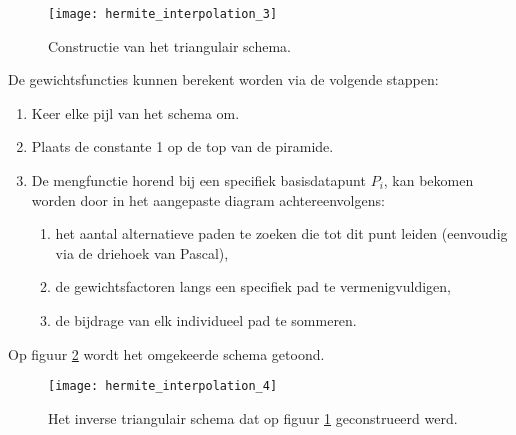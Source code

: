 \begin{itemize}
{\begin{itemize}
				\begin{figure}[ht]
					\centering
					\texttt{[image: hermite\_interpolation\_3]}
					\caption{Constructie van het triangulair schema.}
					\label{fig:20triangular}
				\end{figure}
				De gewichtsfuncties kunnen berekent worden via de volgende stappen:
				\begin{enumerate}
					\item Keer elke pijl van het schema om.
					\item Plaats de constante 1 op de top van de piramide.
					\item De mengfunctie horend bij een specifiek basisdatapunt $P_i$, kan bekomen worden door in het aangepaste diagram achtereenvolgens:
						\begin{enumerate}
							\item het aantal alternatieve paden te zoeken die tot dit punt leiden (eenvoudig via de driehoek van Pascal),
							\item de gewichtsfactoren langs een specifiek pad te vermenigvuldigen,
							\item de bijdrage van elk individueel pad te sommeren.
						\end{enumerate}
				\end{enumerate}
		
				Op figuur \ref{fig:20invtriangular} wordt het omgekeerde schema getoond.
		
				\begin{figure}[ht]
					\centering
					\texttt{[image: hermite\_interpolation\_4]}
					\caption{Het inverse triangulair schema dat op figuur \ref{fig:20triangular} geconstrueerd werd.}
					\label{fig:20invtriangular}
				\end{figure}
				

\end{itemize}}
\end{itemize}
